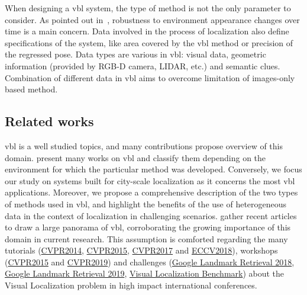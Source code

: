 		When designing a \ac{vbl} system, the type of method is not the only parameter to consider. As pointed out in~\citep{Lowry2016}, robustness to environment appearance changes over time is a main concern. Data involved in the process of localization also define specifications of the system, like area covered by the \ac{vbl} method or precision of the regressed pose.  Data types are various in \ac{vbl}: visual data, geometric information (provided by RGB-D camera, LIDAR, etc.) and semantic clues. Combination of different data in \ac{vbl} aims to overcome limitation of images-only based method.
		
	\subsection{Related works} 
    	\ac{vbl} is a well studied topics, and many contributions propose overview of this domain. \citet{Brejcha2017} present many works on \ac{vbl} and classify them depending on the environment for which the particular method was developed. Conversely, we focus our study on systems built for city-scale localization as it concerns the most \ac{vbl} applications. Moreover, we propose a comprehensive description of the two types of methods used in \ac{vbl}, and highlight the benefits of the use of heterogeneous data in the context of localization in challenging scenarios. \citet{Zamir2016} gather recent articles to draw a large panorama of \ac{vbl}, corroborating the growing importance of this domain in current research. This assumption is comforted regarding the many tutorials (\href{https://sites.google.com/site/lsvpr2014/}{CVPR2014}, \href{https://roboticvision.atlassian.net/wiki/display/PUB/CVPR+2015+Workshop+on+Visual+Place+Recognition+in+Changing+Environments}{CVPR2015}, \href{https://sites.google.com/view/lsvpr2017/home}{CVPR2017} and \href{https://sites.google.com/view/visual-localization-eccv-2018/home}{ECCV2018}), workshops (\href{https://roboticvision.atlassian.net/wiki/display/PUB/CVPR+2015+Workshop+on+Visual+Place+Recognition+in+Changing+Environments}{CVPR2015} and \href{https://sites.google.com/view/ltvl2019}{CVPR2019}) and challenges (\href{https://www.kaggle.com/c/landmark-retrieval-challenge}{Google Landmark Retrieval 2018}, \href{https://www.kaggle.com/c/landmark-retrieval-2019}{Google Landmark Retrieval 2019}, \href{https://www.visuallocalization.net/}{Visual Localization Benchmark}) about the Visual Localization problem in high impact international conferences.
    	
